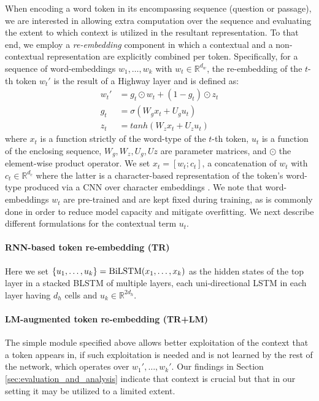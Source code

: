 \documentclass[11pt,a4paper]{article}
\newcommand{\lstm}{\textsc{LSTM}}
\newcommand{\bilstm}{\textsc{B\normalfont{i}LSTM}}
\newcommand{\cnn}{\textsc{CNN}}
\begin{document}
When encoding a word token in its encompassing sequence (question or passage), we are interested in allowing extra computation over the sequence and evaluating the extent to which context is utilized in the resultant representation.
To that end, we employ a \textit{re-embedding} component in which a contextual and a non-contextual representation are explicitly combined per token. Specifically, for a sequence of word-embeddings $w_1,\dots,w_k$ with $w_t\in\mathbb{R}^{d_w}$, the re-embedding of the $t$-th token $w_t'$ is the result of a Highway layer \cite{srivastava2015} and is defined as:
\begin{align*}
w_t' &= g_t \odot w_t + (1-g_t) \odot z_t \\
g_t &= \sigma(W_g x_t + U_g u_t) \\
z_t &= tanh(W_z x_t + U_z u_t)
\end{align*}
where $x_t$ is a function strictly of the word-type of the $t$-th token, $u_t$ is a function of the enclosing sequence, $W_g,W_z,U_g,Uz$ are parameter matrices, and $\odot$ the element-wise product operator. We set $x_t=[w_t;c_t]$, a concatenation of $w_t$ with $c_t\in\mathbb{R}^{d_c}$ where the latter is a character-based representation of the token's word-type produced via a \cnn{} over character embeddings \cite{kim2014}. We note that word-embeddings $w_t$ are pre-trained \citep{pennington2014} and are kept fixed during training, as is commonly done in order to reduce model capacity and mitigate overfitting. We next describe different formulations for the contextual term $u_t$.

\paragraph{RNN-based token re-embedding \small{(TR)}}
Here we set $\{u_1,\dots,u_k\}=\bilstm{}(x_1,\dots,x_k)$ as the hidden states of the top layer in a stacked \bilstm{} of multiple layers, each uni-directional \lstm{} in each layer having $d_h$ cells and $u_k\in\mathbb{R}^{2d_h}$.

\paragraph{LM-augmented token re-embedding \small{(TR+LM)}}
The simple module specified above allows better exploitation of the context that a token appears in, if such exploitation is needed and is not learned by the rest of the network, which operates over $w_1',\dots,w_k'$. 
Our findings in Section \ref{sec:evaluation_and_analysis} indicate that context is crucial but that in our setting it may be utilized to a limited extent.
\end{document}

